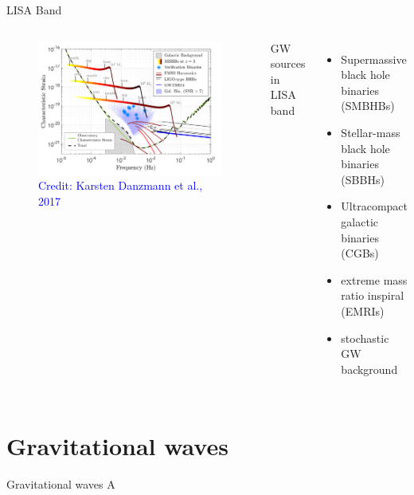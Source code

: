 \documentclass[pdf]{beamer}
\newcommand{\credit}[1]{\tiny{\textcolor{blue}{Credit: #1}}}
\begin{document}
\begin{frame}{LISA Band}
\begin{columns}
\vspace{1cm}

\begin{figure}
\includegraphics[scale=.13]{fig/observedLISA.png}
\caption*{\credit{Karsten Danzmann et al., 2017}}
\end{figure}
\vspace{1cm}

GW sources in LISA band
\begin{itemize}
\item Supermassive black hole binaries (SMBHBs)
\item Stellar-mass black hole binaries (SBBHs)
\item Ultracompact galactic binaries (CGBs)
\item extreme mass ratio inspiral (EMRIs)
\item stochastic GW background 
\end{itemize}
\end{columns}
\end{frame}

\begin{frame}

\end{frame}

\section{Gravitational waves}
\begin{frame}{Gravitational waves}
A
\end{frame}
\end{document}
